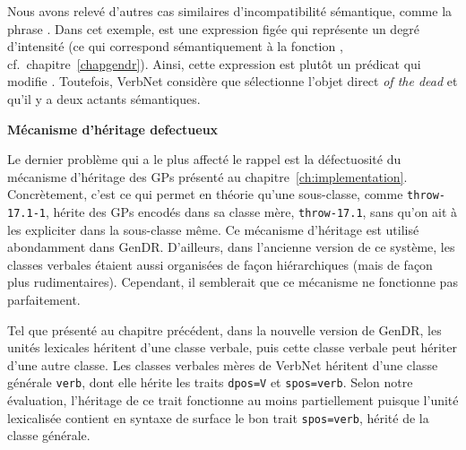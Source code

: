 Nous avons relevé d'autres cas similaires d'incompatibilité sémantique, comme la phrase . Dans cet exemple,  est une expression figée qui représente un degré d'intensité (ce qui correspond sémantiquement à la fonction , cf.~chapitre~\ref{chapgendr}). Ainsi, cette expression est plutôt un prédicat qui modifie . Toutefois, VerbNet considère que  sélectionne l'objet direct \emph{of the dead} et qu'il y a deux actants sémantiques.

\textbf{Mécanisme d'héritage defectueux}

Le dernier problème qui a le plus affecté le rappel est la défectuosité du mécanisme d'héritage des \acp{GP} présenté au chapitre~\ref{ch:implementation}. Concrètement, c'est ce qui permet en théorie qu'une sous-classe, comme \texttt{throw-17.1-1}, hérite des \acp{GP} encodés dans sa classe mère, \texttt{throw-17.1}, sans qu'on ait à les expliciter dans la sous-classe même. Ce mécanisme d'héritage est utilisé abondamment dans GenDR. D'ailleurs, dans l'ancienne version de ce système, les classes verbales étaient aussi organisées de façon hiérarchiques (mais de façon plus rudimentaires). Cependant, il semblerait que ce mécanisme ne fonctionne pas parfaitement.

Tel que présenté au chapitre précédent, dans la nouvelle version de GenDR, les unités lexicales héritent d'une classe verbale, puis cette classe verbale peut hériter d'une autre classe. Les classes verbales mères de VerbNet héritent d'une classe générale \texttt{verb}, dont elle hérite les traits \texttt{dpos=V} et \texttt{spos=verb}. Selon notre évaluation, l'héritage de ce trait fonctionne au moins partiellement puisque l'unité lexicalisée contient en syntaxe de surface le bon trait \texttt{spos=verb}, hérité de la classe générale.

